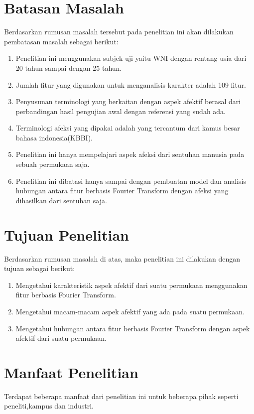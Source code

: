 \section{Batasan Masalah}
\indent Berdasarkan rumusan masalah tersebut pada penelitian ini akan dilakukan pembatasan masalah sebagai berikut:
\begin{enumerate}
\item Penelitian ini menggunakan subjek uji yaitu WNI dengan rentang usia dari 20 tahun sampai dengan 25 tahun.
\item Jumlah fitur yang digunakan untuk menganalisis karakter adalah 109 fitur.
\item Penyusunan terminologi yang berkaitan dengan aspek afektif berasal dari perbandingan hasil pengujian awal dengan referensi yang sudah ada.
\item Terminologi afeksi yang dipakai adalah yang tercantum dari kamus besar bahasa indonesia(KBBI).
\item Penelitian ini hanya mempelajari aspek afeksi dari sentuhan manusia pada sebuah permukaan saja.
\item Penelitian ini dibatasi hanya sampai dengan pembuatan model dan analisis hubungan antara fitur berbasis Fourier Transform dengan afeksi yang dihasilkan dari sentuhan saja.

\end{enumerate}


\section{Tujuan Penelitian}
\indent Berdasarkan rumusan masalah di atas, maka penelitian ini dilakukan dengan tujuan sebagai berikut:
\begin{enumerate}
	\item Mengetahui karakteristik aspek afektif dari suatu permukaan menggunakan fitur berbasis Fourier Transform.
	\item Mengetahui macam-macam aspek afektif yang ada pada suatu permukaan.
	\item Mengetahui hubungan antara fitur berbasis Fourier Transform dengan aspek afektif dari suatu permukaan.
\end{enumerate}


\section{Manfaat Penelitian}
\indent Terdapat beberapa manfaat dari penelitian ini untuk beberapa pihak seperti peneliti,kampus dan industri.

